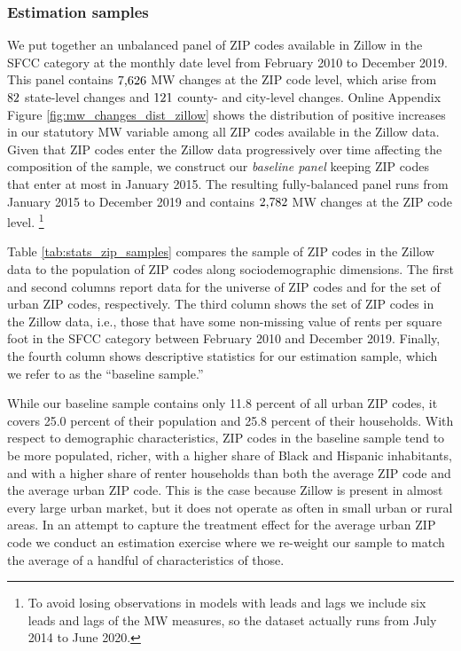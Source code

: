 \subsubsection{Estimation samples}\label{sec:data_final_panel}

We put together an unbalanced panel of ZIP codes available in Zillow in the 
SFCC category at the monthly date level from February 2010 to December 2019.
This panel contains $\textnormal{7,626}$ MW changes at the ZIP code level, 
which arise from $\textnormal{82}$ state-level changes and 
$\textnormal{121}$ county- and city-level changes.
Online Appendix Figure \ref{fig:mw_changes_dist_zillow} shows the distribution 
of positive increases in our statutory MW variable among all ZIP codes available 
in the Zillow data.
Given that ZIP codes enter the Zillow data progressively over time affecting 
the composition of the sample,
we construct our \textit{baseline panel} keeping ZIP codes that enter at most 
in January 2015.
The resulting fully-balanced panel runs from January 2015 to December 2019
and contains $\textnormal{2,782}$ MW changes at the ZIP code level.%
\footnote{To avoid losing observations in models with leads and lags we include 
	six leads and lags of the MW measures, so the dataset actually runs from 
	July 2014 to June 2020.}

Table \ref{tab:stats_zip_samples} compares the sample of ZIP codes in the Zillow
data to the population of ZIP codes along sociodemographic dimensions.
The first and second columns report data for the universe of ZIP codes and 
for the set of urban ZIP codes, respectively.
The third column shows the set of ZIP codes in the Zillow data, i.e., those 
that have some non-missing value of rents per square foot in the SFCC category 
between February 2010 and December 2019.
Finally, the fourth column shows descriptive statistics for our estimation 
sample, which we refer to as the ``baseline sample.''

While our baseline sample contains only 11.8 percent of all urban ZIP codes, it 
covers 25.0 percent of their population and 25.8 percent of their households.
With respect to demographic characteristics, ZIP codes in the baseline sample 
tend to be more populated, richer, with a higher share of Black and Hispanic 
inhabitants, and with a higher share of renter households than both 
the average ZIP code and the average urban ZIP code.
This is the case because Zillow is present in almost every large urban market, 
but it does not operate as often in small urban or rural areas.
In an attempt to capture the treatment effect for the average urban ZIP code 
we conduct an estimation exercise where we re-weight our sample to match the 
average of a handful of characteristics of those.

